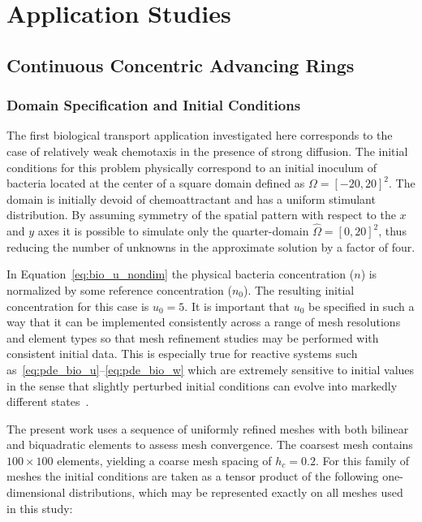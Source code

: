 \clearpage
\section{Application Studies}

\subsection{Continuous Concentric Advancing Rings\label{sec:concentric_rings}}
\subsubsection{Domain Specification and Initial Conditions}

The first biological transport application investigated here corresponds to the case of relatively weak chemotaxis in the presence of strong diffusion.  The initial conditions for this problem physically correspond to an initial inoculum of bacteria located at the center of a square domain defined as $\Omega=[-20,20]^2$.  The domain is initially devoid of chemoattractant and has a uniform stimulant distribution. By assuming symmetry of the spatial pattern with respect to the $x$ and $y$ axes it is possible to simulate only the quarter-domain $\hat{\Omega}=[0,20]^2$, thus reducing the number of unknowns in the approximate solution by a factor of four.

In Equation~\eqref{eq:bio_u_nondim} the physical bacteria concentration ($n$) is normalized by some reference concentration ($n_0$). The resulting initial concentration for this case is $u_0=5$.  It is important that $u_0$ be specified in such a way that it can be implemented consistently across a range of mesh resolutions and element types so that mesh refinement studies may be performed with consistent initial data.  This is especially true for reactive systems such as~\eqref{eq:pde_bio_u}--\eqref{eq:pde_bio_w} which are extremely sensitive to initial values in the sense that slightly perturbed initial conditions can evolve into markedly different states~\cite{modelling_error}.

The present work uses a sequence of uniformly refined meshes with both bilinear and biquadratic elements to assess mesh convergence.  The coarsest mesh contains $100\times100$ elements, yielding a coarse mesh spacing of $h_c=0.2$. For this family of meshes the initial conditions are taken as a tensor product of the following one-dimensional distributions, which may be represented exactly on all meshes used in this study:

